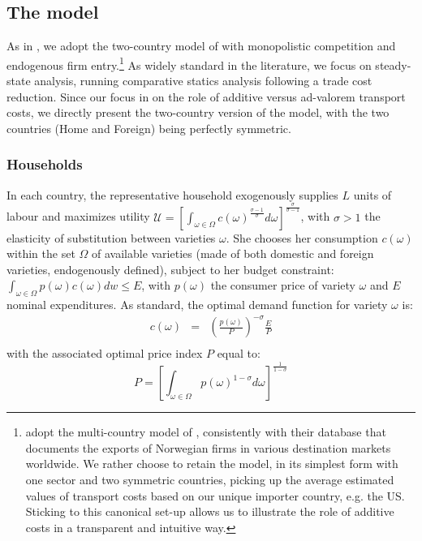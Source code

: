 \documentclass[a4paper,11pt]{article}
\begin{document}
\subsection{The model}


As in \cite{sorensen2014}, we adopt the two-country model of \cite{melitz} with monopolistic competition and endogenous firm entry.\footnote{\cite{Irrazabal_2015} adopt the multi-country model of \cite{chaney2008}, consistently with their database that documents the exports of Norwegian firms in various destination markets worldwide. We rather choose to retain the \cite{melitz} model, in its simplest form with one sector and two symmetric countries, picking up the average estimated values of transport costs based on our unique importer country, e.g. the US. Sticking to this canonical set-up allows us to illustrate the role of additive costs in a transparent and intuitive way.} As widely standard in the literature, we focus on steady-state analysis, running comparative statics analysis following a trade cost reduction. Since our focus in on the role of additive versus ad-valorem transport costs, we directly present the two-country version of the model, with the two countries (Home and Foreign) being perfectly symmetric.

\subsubsection{Households}

In each country, the representative household exogenously supplies $L$ units of labour and maximizes utility $\mathcal{U} = \left[ \int_{\omega \in \Omega}c(\omega)^{\frac{\sigma-1}{\sigma}} d\omega \right]^{\frac{\sigma}{\sigma-1}}$, with $\sigma>1$ the elasticity of substitution between varieties $\omega$. She chooses her consumption $c(\omega)$  within the set $\Omega$ of available varieties (made of both domestic and foreign varieties, endogenously defined), subject to her budget constraint: $\int_{\omega \in \Omega} p(\omega) c(\omega) dw \leq E$, with $p(\omega)$ the consumer price of variety $\omega$ and $E$ nominal expenditures. As standard, the optimal demand function for variety $\omega$ is:
\begin{eqnarray*}
c(\omega) &=& \left(\frac{p(\omega)}{P}  \right)^{-\sigma} \frac{E}{P}\\
\end{eqnarray*}
\noindent with the associated optimal price index $P$ equal to:
\begin{equation}
P = \left[ \int_{\omega \in \Omega}p(\omega)^{1-\sigma}d\omega\right]^{\frac{1}{1-\sigma}} \label{eq:CPI}
\end{equation}
\end{document}
